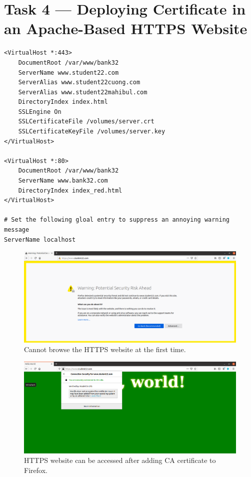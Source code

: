 \section{Task 4 --- Deploying Certificate in an Apache-Based HTTPS Website}
%
\begin{lstlisting}[caption=Content of the {\fontfamily{qcr}\selectfont
    bank32\_apache\_ssl.conf} file., label={lst:server_config}]
<VirtualHost *:443> 
    DocumentRoot /var/www/bank32
    ServerName www.student22.com
    ServerAlias www.student22cuong.com
    ServerAlias www.student22mahibul.com
    DirectoryIndex index.html
    SSLEngine On 
    SSLCertificateFile /volumes/server.crt
    SSLCertificateKeyFile /volumes/server.key
</VirtualHost>

<VirtualHost *:80> 
    DocumentRoot /var/www/bank32
    ServerName www.bank32.com
    DirectoryIndex index_red.html
</VirtualHost>

# Set the following gloal entry to suppress an annoying warning message
ServerName localhost

\end{lstlisting}

\begin{figure}
    \centering
    \includegraphics[height=\textheight,width=\textwidth,keepaspectratio]
    {figures/https_do_not_work.png}
    \caption{Cannot browse the HTTPS website at the first time.}
    \label{fig:https_do_not_work}
\end{figure}

\begin{figure}
    \centering
    \includegraphics[height=\textheight,width=\textwidth,keepaspectratio]
    {figures/https_work.png}
    \caption{HTTPS website can be accessed after adding CA certificate to Firefox.}
    \label{fig:https_work}
\end{figure}


